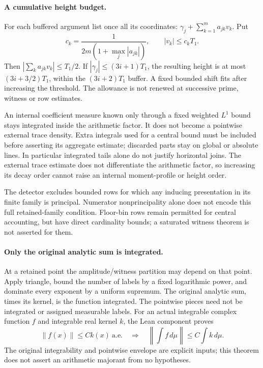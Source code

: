\paragraph{A cumulative height budget.}
For each buffered argument list once all its coordinates:
$\gamma_j+\sum_{k=1}^m a_{jk}v_k$. Put
\[
 c_k=\frac1{2m(1+\max_j|a_{jk}|)},\qquad |v_k|\le c_kT_1.
\]
Then $|\sum_k a_{jk}v_k|\le T_1/2$. If
$|\gamma_j|\le(3i+1)T_1$, the resulting height is at most
$(3i+3/2)T_1$, within the $(3i+2)T_1$ buffer. A fixed bounded shift
fits after increasing the threshold. The allowance is not renewed at
successive prime, witness or row estimates.

An internal coefficient measure known only through a fixed weighted
$L^1$ bound stays integrated inside the arithmetic factor. It does not
become a pointwise external trace density. Extra integrals used for a
central bound must be included before asserting its aggregate estimate;
discarded parts stay on global or absolute lines. In particular integrated
tails alone do not justify horizontal joins. The external trace estimate
does not differentiate the arithmetic factor, so increasing its decay
order cannot raise an internal moment-profile or height order.

The detector excludes bounded rows for which any inducing presentation
in its finite family is principal. Numerator nonprincipality alone does
not encode this full retained-family condition. Floor-bin rows remain
permitted for central accounting, but have direct cardinality bounds;
a saturated witness theorem is not asserted for them.

\paragraph{Only the original analytic sum is integrated.}
At a retained point the amplitude/witness partition may depend on that
point. Apply triangle, bound the number of labels by a fixed logarithmic
power, and dominate every exponent by a uniform supremum. The original
analytic sum, times its kernel, is the function integrated. The pointwise
pieces need not be integrated or assigned measurable labels.
For an actual integrable complex function $f$ and integrable real kernel
$k$, the Lean component proves
\[
 \|f(x)\|\le Ck(x)\ \text{a.e.}\quad\Longrightarrow\quad
 \left\|\int f\,d\mu\right\|\le C\int k\,d\mu.
\]
The original integrability and pointwise envelope are explicit inputs;
this theorem does not assert an arithmetic majorant from no hypotheses.

